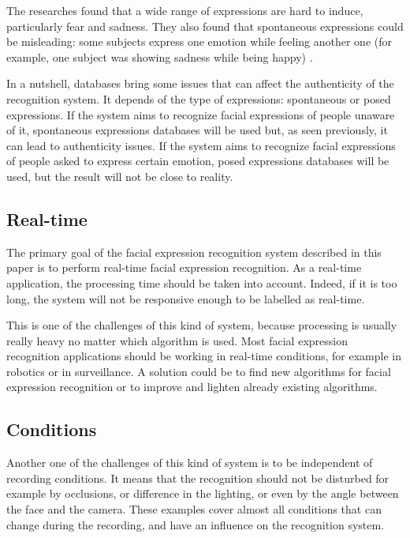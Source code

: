 \noindent The researches found that a wide range of expressions are hard to induce, particularly fear and sadness. They also found that spontaneous expressions could be misleading: some subjects express one emotion while feeling another one (for example, one subject was showing sadness while being happy) \cite{SEB07}.
\newline

\noindent In a nutshell, databases bring some issues that can affect the authenticity of the recognition system. It depends of the type of expressions: spontaneous or posed expressions. If the system aims to recognize facial expressions of people unaware of it, spontaneous expressions databases will be used but, as seen previously, it can lead to authenticity issues. If the system aims to recognize facial expressions of people asked to express certain emotion, posed expressions databases will be used, but the result will not be close to reality.
\newline

\subsection{Real-time}

\vspace{\baselineskip}
\noindent The primary goal of the facial expression recognition system described in this paper is to perform real-time facial expression recognition. As a real-time application, the processing time should be taken into account. Indeed, if it is too long, the system will not be responsive enough to be labelled as real-time.
\newline

\noindent This is one of the challenges of this kind of system, because processing is usually really heavy no matter which algorithm is used. Most facial expression recognition applications should be working in real-time conditions, for example in robotics or in surveillance. A solution could be to find new algorithms for facial expression recognition or to improve and lighten already existing algorithms.
\newline

\subsection{Conditions}

\vspace{\baselineskip}
\noindent Another one of the challenges of this kind of system is to be independent of recording conditions. It means that the recognition should not be disturbed for example by occlusions, or difference in the lighting, or even by the angle between the face and the camera. These examples cover almost all conditions that can change during the recording, and have an influence on the recognition system. 
\newline


